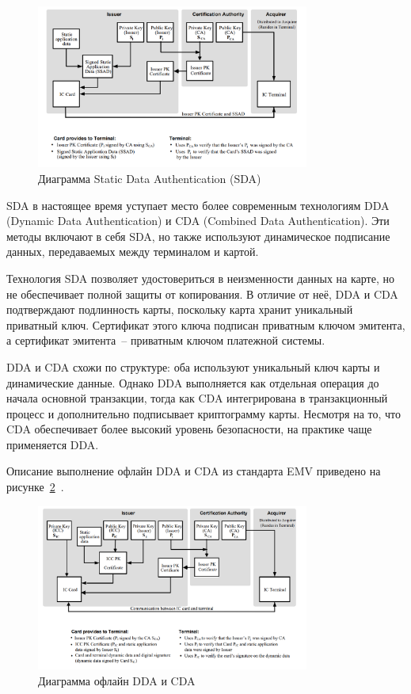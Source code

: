 \begin{figure}[H]
    \centering
    \includegraphics[width=0.8\textwidth]{images/research/emv_offline_sda}
    \caption{\centering Диаграмма Static Data Authentication (SDA)}
    \label{fig:emv_offline_sda}
\end{figure}

SDA в настоящее время уступает место более современным технологиям DDA (Dynamic Data Authentication) и CDA (Combined Data Authentication).
Эти методы включают в себя SDA, но также используют динамическое подписание данных, передаваемых между терминалом и картой.

Технология SDA позволяет удостовериться в неизменности данных на карте, но не обеспечивает полной защиты от копирования.
В отличие от неё, DDA и CDA подтверждают подлинность карты, поскольку карта хранит уникальный приватный ключ.
Сертификат этого ключа подписан приватным ключом эмитента, а сертификат эмитента~-- приватным ключом платежной системы.

DDA и CDA схожи по структуре: оба используют уникальный ключ карты и динамические данные.
Однако DDA выполняется как отдельная операция до начала основной транзакции, тогда как CDA интегрирована в транзакционный процесс и дополнительно подписывает криптограмму карты.
Несмотря на то, что CDA обеспечивает более высокий уровень безопасности, на практике чаще применяется DDA.

Описание выполнение офлайн DDA и CDA из стандарта EMV приведено на рисунке~\ref{fig:emv_offline_dda_cda}~\cite{emv_book_2}.

\begin{figure}[H]
    \centering
    \includegraphics[width=0.8\textwidth]{images/research/emv_offline_dda_cda}
    \caption{\centering Диаграмма офлайн DDA и CDA}
    \label{fig:emv_offline_dda_cda}
\end{figure}

